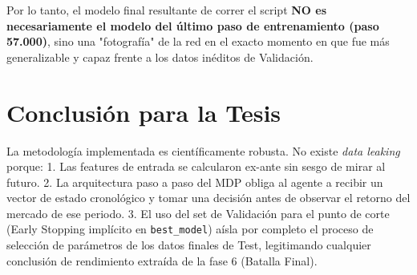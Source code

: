 \documentclass[12pt,a4paper]{article}
\begin{document}
Por lo tanto, el modelo final resultante de correr el script \textbf{NO es necesariamente el modelo del último paso de entrenamiento (paso 57.000)}, sino una "fotografía" de la red en el exacto momento en que fue más generalizable y capaz frente a los datos inéditos de Validación.

\section{Conclusión para la Tesis}
La metodología implementada es científicamente robusta. No existe \textit{data leaking} porque:
1. Las features de entrada se calcularon ex-ante sin sesgo de mirar al futuro.
2. La arquitectura paso a paso del MDP obliga al agente a recibir un vector de estado cronológico y tomar una decisión antes de observar el retorno del mercado de ese periodo.
3. El uso del set de Validación para el punto de corte (Early Stopping implícito en \texttt{best\_model}) aísla por completo el proceso de selección de parámetros de los datos finales de Test, legitimando cualquier conclusión de rendimiento extraída de la fase 6 (Batalla Final).
\end{document}

